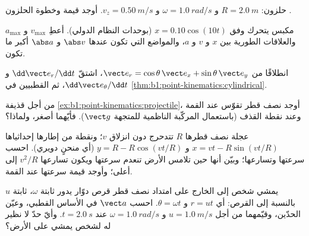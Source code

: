 \begin{exercise}[$\star\star$]\label{exo:b1:point-kinematics:7}
حلزون: $R = \qty{2.0}{m}$ و $\omega = \qty{1.0}{rad/s}$ و $v_z = \qty{0.50}{m/s}$.
أوجد قيمة   وخطوة الحلزون .
\end{exercise}

\begin{exercise}[$\star\star$]\label{exo:b1:point-kinematics:8}
مكبس يتحرك وفق $x = 0.10\cos(10t)$ (بوحدات النظام الدولي). أعطِ $v_{\max}$ و $a_{\max}$
والعلاقات الطورية بين $x$ و $v$ و $a$، والمواضع التي تكون عندها
$\abs v$ و $\abs a$ أكبر ما تكون.
\end{exercise}

\begin{exercise}[$\star\star$]\label{exo:b1:point-kinematics:9}
انطلاقًا من $\vect e_r = \cos\theta\,\vect e_x + \sin\theta\,\vect e_y$،
اشتقّ $\dd\vect e_r/\dd t$ و $\dd\vect e_\theta/\dd t$، ثم
  القطبيين في \cref{thm:b1:point-kinematics:cylindrical}.
\end{exercise}

\begin{exercise}[$\star\star\star$]\label{exo:b1:point-kinematics:10}
من أجل قذيفة \cref{ex:b1:point-kinematics:projectile}، أوجد
نصف قطر تقوّس  عند القمة وعند
نقطة القذف (باستعمال المركّبة الناظمية للمتجهة $\vect g$). فأيّهما أصغر،
ولماذا؟
\end{exercise}

\begin{exercise}[$\star\star\star$]\label{exo:b1:point-kinematics:11}
عجلة نصف قطرها $R$ تتدحرج دون انزلاق  $v$؛ ونقطة من
إطارها إحداثياها $x = vt - R\sin(vt/R)$ و $y = R - R\cos(vt/R)$
(أي منحنٍ دويري). احسب سرعتها وتسارعها؛ وبيّن أنها حين
تلامس الأرض تنعدم سرعتها ويكون تسارعها
$v^2/R$ إلى أعلى؛ وأوجد قيمة سرعتها عند القمة.
\end{exercise}

\begin{exercise}[$\star\star\star$]\label{exo:b1:point-kinematics:12}
يمشي شخص إلى الخارج على امتداد نصف قطر قرص دوّار يدور  ثابتة $\omega$،  ثابتة $u$ بالنسبة إلى القرص:
أي $r = ut$ و $\theta = \omega t$. احسب $\vect a$ في الأساس القطبي،
وعيّن الحدّين، وقيّمهما من أجل $u = \qty{1.0}{m/s}$ و
$\omega = \qty{1.0}{rad/s}$ عند $t = \qty{2.0}{s}$. وأيّ حدّ لا
نظير له لشخص يمشي على الأرض؟
\end{exercise}

